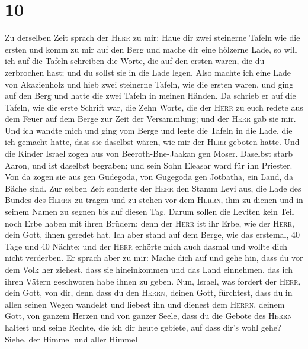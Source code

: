 \hypertarget{section-9}{%
\section{10}\label{section-9}}

 Zu derselben Zeit sprach der \textsc{Herr} zu mir: Haue
dir zwei steinerne Tafeln wie die ersten und komm zu mir auf den Berg
und mache dir eine hölzerne Lade,  so will ich auf die
Tafeln schreiben die Worte, die auf den ersten waren, die du zerbrochen
hast; und du sollst sie in die Lade legen.  Also machte
ich eine Lade von Akazienholz und hieb zwei steinerne Tafeln, wie die
ersten waren, und ging auf den Berg und hatte die zwei Tafeln in meinen
Händen.  Da schrieb er auf die Tafeln, wie die erste
Schrift war, die Zehn Worte, die der \textsc{Herr} zu euch redete aus
dem Feuer auf dem Berge zur Zeit der Versammlung; und der \textsc{Herr}
gab sie mir.  Und ich wandte mich und ging vom Berge und
legte die Tafeln in die Lade, die ich gemacht hatte, dass sie daselbst
wären, wie mir der \textsc{Herr} geboten hatte.  Und die
Kinder Israel zogen aus von Beeroth-Bne-Jaakan gen Moser. Daselbst starb
Aaron, und ist daselbst begraben; und sein Sohn Eleasar ward für ihn
Priester.  Von da zogen sie aus gen Gudegoda, von Gugegoda
gen Jotbatha, ein Land, da Bäche sind.  Zur selben Zeit
sonderte der \textsc{Herr} den Stamm Levi aus, die Lade des Bundes des
\textsc{Herrn} zu tragen und zu stehen vor dem \textsc{Herrn}, ihm zu
dienen und in seinem Namen zu segnen bis auf diesen Tag. 
Darum sollen die Leviten kein Teil noch Erbe haben mit ihren Brüdern;
denn der \textsc{Herr} ist ihr Erbe, wie der \textsc{Herr}, dein Gott,
ihnen geredet hat.  Ich aber stand auf dem Berge, wie das
erstemal, 40 Tage und 40 Nächte; und der \textsc{Herr} erhörte mich auch
dasmal und wollte dich nicht verderben.  Er sprach aber
zu mir: Mache dich auf und gehe hin, dass du vor dem Volk her ziehest,
dass sie hineinkommen und das Land einnehmen, das ich ihren Vätern
geschworen habe ihnen zu geben.  Nun, Israel, was fordert
der \textsc{Herr}, dein Gott, von dir, denn dass du den \textsc{Herrn},
deinen Gott, fürchtest, dass du in allen seinen Wegen wandelst und
liebest ihn und dienest dem \textsc{Herrn}, deinem Gott, von ganzem
Herzen und von ganzer Seele,  dass du die Gebote des
\textsc{Herrn} haltest und seine Rechte, die ich dir heute gebiete, auf
dass dir's wohl gehe?  Siehe, der Himmel und aller Himmel
